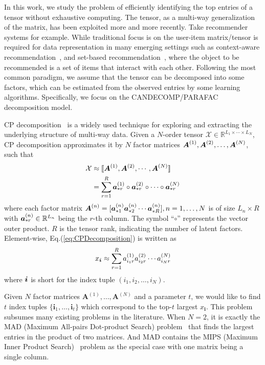 \documentclass[letterpaper]{article}
\newcommand{\Sca}[3]{{#1}^{(#2)}_{i_#2#3}}%
\newcommand{\anr}[2]{\Sca{a}{#1}{#2}}
\newcommand{\T}[1]{\mathcal{#1}}
\newcommand{\KT}[1]{\llbracket #1 \rrbracket}
\newcommand{\V}[1]{{\boldsymbol{{\MakeLowercase{#1}}}}}
\newcommand{\ColVec}[3]{\V{#1}^{(#2)}_{#3}}
\newcommand{\ColVecA}[1]{\V{a}^{(#1)}_{*r}}
\newcommand{\M}[1]{{\boldsymbol{{\MakeUppercase{#1}}}}}
\newcommand{\FacMat}[2]{\M{#1}^{(#2)}}
\newcommand{\Eqn}[1]{Eq.(\ref{eq:#1})}
\begin{document}
In this work,
we study the problem of efficiently identifying the top entries of a tensor
without exhaustive computing.
The tensor, as a multi-way generalization of the matrix,
has been exploited more and more recently.
Take recommender systems for example.
While traditional focus is on the user-item matrix/tensor
is required for data representation in many emerging settings
such as context-aware recommendation~\cite{Rendle_PITF,KoYe09},
and set-based recommendation~\cite{HuYiLa15},
where the object to be recommended is a set of items that interact with each other.
Following the most common paradigm, we assume that the tensor can be decomposed into some factors,
which can be estimated from the observed entries by some learning algorithms.
Specifically, we focus on the CANDECOMP/PARAFAC decomposition model.

CP decomposition~\cite{KoBa09} is a widely used technique for exploring and
extracting the underlying structure of multi-way data.
Given a $N$-order tensor $\T{X}\in\mathbb{R}^{L_1\times \cdots\times L_N}$,
CP decomposition approximates it by $N$ factor matrices $\FacMat{A}{1},\FacMat{A}{2},\ldots,\FacMat{A}{N}$,
such that
\begin{align}
\label{eq:CPDecomposition}
\T{X}&\approx\KT{\FacMat{A}{1},\FacMat{A}{2},\cdots,\FacMat{A}{N}} \\ \notag
&=\sum_{r=1}^R\ColVecA{1}\circ\ColVecA{2}\circ\cdots\circ\ColVecA{N}
\end{align}
where each factor matrix
$\FacMat{A}{n}=[\ColVec{a}{n}{*1}\ColVec{a}{n}{*2}\cdots\ColVec{a}{n}{*R}], n=1,\ldots,N$
is of size $L_n\times R$ with $\ColVec{a}{n}{*r}\in\mathbb{R}^{L_n}$
being the $r$-th column.
The symbol ``$\circ$'' represents the vector outer product.
$R$ is the tensor rank, indicating the number of latent factors.
Element-wise, \Eqn{CPDecomposition} is written as
\begin{align}
\label{eq:CPValue}
x_\V{i} \approx \sum_{r=1}^{R}\anr{1}{r}\anr{2}{r}\cdots\anr{N}{r}
\end{align}
where $\V{i}$ is short for the index tuple $(i_1,i_2,\ldots,i_N)$.

Given $N$ factor matrices $\textbf{A}^{(1)},\ldots,\textbf{A}^{(N)}$ and a parameter $t$,
we would like to find $t$ index tuples $\{\boldsymbol{i}_1,\ldots,\boldsymbol{i}_t\}$
which correspond to the top-$t$ largest $x_{\boldsymbol{i}}$.
This problem subsumes many existing problems in the literature.
When $N=2$, it is exactly the MAD (Maximum All-pairs Dot-product Search) problem~\cite{BaPiKoSe15}
that finds the largest entries in the product of two matrices.
And MAD contains the MIPS (Maximum Inner Product Search)~\cite{Cohen97} problem
as the special case with one matrix being a single column.
\end{document}
